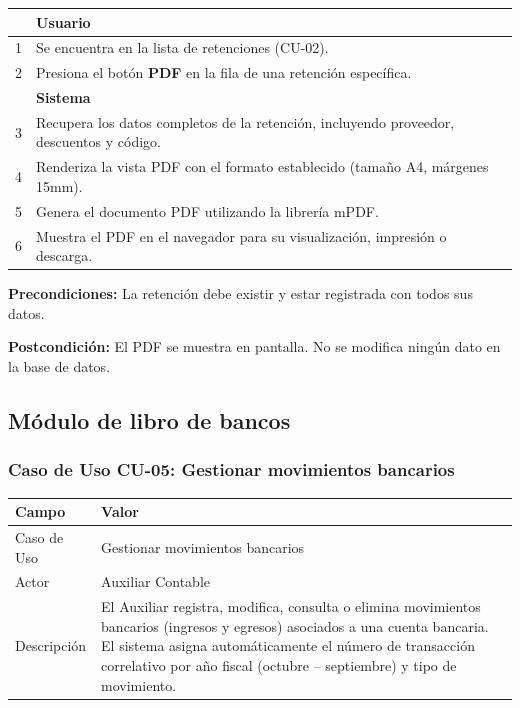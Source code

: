 \documentclass[stu]{apa7}
\begin{document}
\begin{tabularx}{\textwidth}{|c|X|}
\hline
& \textbf{Usuario} \\
\hline
1 & Se encuentra en la lista de retenciones (CU-02). \\
\hline
2 & Presiona el botón \textbf{PDF} en la fila de una retención específica. \\
\hline
& \textbf{Sistema} \\
\hline
3 & Recupera los datos completos de la retención, incluyendo proveedor, descuentos y código. \\
\hline
4 & Renderiza la vista PDF con el formato establecido (tamaño A4, márgenes 15mm). \\
\hline
5 & Genera el documento PDF utilizando la librería mPDF. \\
\hline
6 & Muestra el PDF en el navegador para su visualización, impresión o descarga. \\
\hline
\end{tabularx}

\vspace{0.3cm}

\textbf{Precondiciones:} La retención debe existir y estar registrada con todos sus datos.

\textbf{Postcondición:} El PDF se muestra en pantalla. No se modifica ningún dato en la base de datos.

\newpage

\subsection{Módulo de libro de bancos}

\subsubsection{Caso de Uso CU-05: Gestionar movimientos bancarios}

\begin{tabularx}{\textwidth}{|l|X|}
\hline
\rowcolor[gray]{0.9}
\textbf{Campo} & \textbf{Valor} \\
\hline
Caso de Uso & Gestionar movimientos bancarios \\
\hline
Actor & Auxiliar Contable \\
\hline
Descripción & El Auxiliar registra, modifica, consulta o elimina movimientos bancarios (ingresos y egresos) asociados a una cuenta bancaria. El sistema asigna automáticamente el número de transacción correlativo por año fiscal (octubre -- septiembre) y tipo de movimiento. \\
\hline
\end{tabularx}
\end{document}
